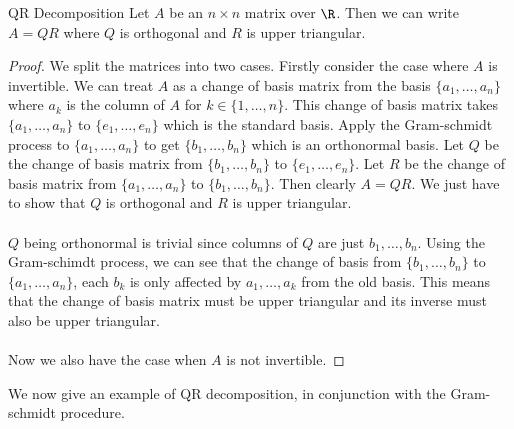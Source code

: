 \begin{thm}{QR Decomposition}{} Let $A$ be an $n\times n$ matrix over $\R$. Then we can write $A=QR$ where $Q$ is orthogonal and $R$ is upper triangular. \tcbline
\begin{proof}We split the matrices into two cases. Firstly consider the case where $A$ is invertible. We can treat $A$ as a change of basis matrix from the basis $\{a_1,\dots,a_n\}$ where $a_k$ is the column of $A$ for $k\in\{1,\dots,n\}$. This change of basis matrix takes $\{a_1,\dots,a_n\}$ to $\{e_1,\dots,e_n\}$ which is the standard basis. Apply the Gram-schmidt process to $\{a_1,\dots,a_n\}$ to get $\{b_1,\dots,b_n\}$ which is an orthonormal basis. Let $Q$ be the change of basis matrix from $\{b_1,\dots,b_n\}$ to $\{e_1,\dots,e_n\}$. Let $R$ be the change of basis matrix from $\{a_1,\dots,a_n\}$ to $\{b_1,\dots,b_n\}$. Then clearly $A=QR$. We just have to show that $Q$ is orthogonal and $R$ is upper triangular. \\~\\
$Q$ being orthonormal is trivial since columns of $Q$ are just $b_1,\dots,b_n$. Using the Gram-schimdt process, we can see that the change of basis from $\{b_1,\dots,b_n\}$ to $\{a_1,\dots,a_n\}$, each $b_k$ is only affected by $a_1,\dots,a_k$ from the old basis. This means that the change of basis matrix must be upper triangular and its inverse must also be upper triangular. \\~\\
Now we also have the case when $A$ is not invertible. 
\end{proof}
\end{thm}

We now give an example of QR decomposition, in conjunction with the Gram-schmidt procedure. 

